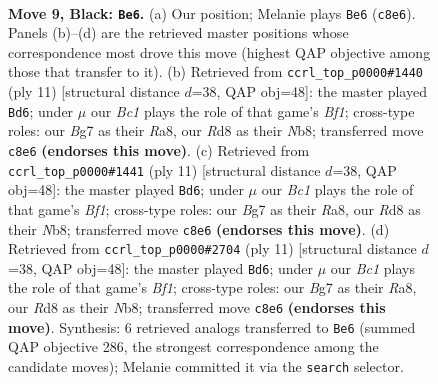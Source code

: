 \documentclass[11pt]{article}
\begin{document}
\clearpage

\begin{figure}[p]\centering
\begin{subfigure}{0.46\textwidth}\centering
\resizebox{\linewidth}{!}{%
\newchessgame
\chessboard[
  setfen={rnbr2k1/ppp2pbp/5np1/4p3/2P1P2P/2N2N2/PP2BPP1/R1B1K2R b KQ - 0 9},
  showmover=false,
  pgfstyle=straightmove, color=movearrow, markmove={c8-e6}
]}
\caption{}
\end{subfigure}\hfill
\begin{subfigure}{0.46\textwidth}\centering
\resizebox{\linewidth}{!}{%
\newchessgame
\chessboard[
  setfen={rnbk1b1r/ppp2ppp/5n2/4p3/4P3/2N2N2/PPP2PPP/R1B1KB1R b KQ - 1 6},
  showmover=false,
  pgfstyle=straightmove, color=movearrow, markmove={f8-d6}
]}
\caption{}
\end{subfigure}
\\[4pt]
\begin{subfigure}{0.46\textwidth}\centering
\resizebox{\linewidth}{!}{%
\newchessgame
\chessboard[
  setfen={rnbk1b1r/ppp2ppp/5n2/4p3/4P3/2N2N2/PPP2PPP/R1B1KB1R b KQ - 1 6},
  showmover=false,
  pgfstyle=straightmove, color=movearrow, markmove={f8-d6}
]}
\caption{}
\end{subfigure}\hfill
\begin{subfigure}{0.46\textwidth}\centering
\resizebox{\linewidth}{!}{%
\newchessgame
\chessboard[
  setfen={rnbk1b1r/ppp2ppp/5n2/4p3/4P3/2N2N2/PPP2PPP/R1B1KB1R b KQ - 1 6},
  showmover=false,
  pgfstyle=straightmove, color=movearrow, markmove={f8-d6}
]}
\caption{}
\end{subfigure}
\caption{\textbf{Move 9, Black: \texttt{Be6}.} (a) Our position; Melanie plays \texttt{Be6} (\texttt{c8e6}). Panels (b)--(d) are the retrieved master positions whose correspondence most drove this move (highest QAP objective among those that transfer to it). (b) Retrieved from \texttt{ccrl\_top\_p0000\#1440} (ply 11) [structural distance $d$=38, QAP obj=48]: the master played \texttt{Bd6}; under $\mu$ our \emph{Bc1} plays the role of that game's \emph{Bf1}; cross-type roles: our \emph{B}g7 as their \emph{R}a8, our \emph{R}d8 as their \emph{N}b8; transferred move \texttt{c8e6} \textbf{(endorses this move)}. (c) Retrieved from \texttt{ccrl\_top\_p0000\#1441} (ply 11) [structural distance $d$=38, QAP obj=48]: the master played \texttt{Bd6}; under $\mu$ our \emph{Bc1} plays the role of that game's \emph{Bf1}; cross-type roles: our \emph{B}g7 as their \emph{R}a8, our \emph{R}d8 as their \emph{N}b8; transferred move \texttt{c8e6} \textbf{(endorses this move)}. (d) Retrieved from \texttt{ccrl\_top\_p0000\#2704} (ply 11) [structural distance $d$=38, QAP obj=48]: the master played \texttt{Bd6}; under $\mu$ our \emph{Bc1} plays the role of that game's \emph{Bf1}; cross-type roles: our \emph{B}g7 as their \emph{R}a8, our \emph{R}d8 as their \emph{N}b8; transferred move \texttt{c8e6} \textbf{(endorses this move)}. Synthesis: 6 retrieved analogs transferred to \texttt{Be6} (summed QAP objective 286, the strongest correspondence among the candidate moves); Melanie committed it via the \texttt{search} selector.}
\label{fig:thought-m17}
\end{figure}
\end{document}
